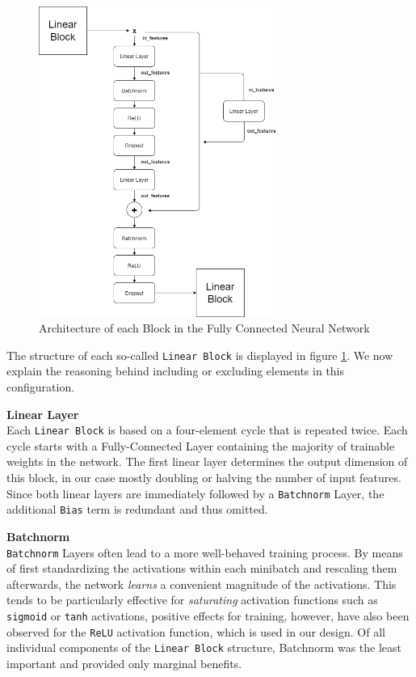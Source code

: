 \documentclass[12pt, letterpaper]{article}
\begin{document}
\begin{figure}[t]
    \centering
    \includegraphics[width=0.7\textwidth]{mlp_architecture.png}
    \caption{Architecture of each Block in the Fully Connected Neural Network}
    \label{fig:linear-block}
\end{figure}

The structure of each so-called \texttt{Linear Block} is displayed in figure \ref{fig:linear-block}.
We now explain the reasoning behind including or excluding elements in this configuration.

\textbf{Linear Layer} \\
Each \texttt{Linear Block} is based on a four-element cycle that is repeated twice.
Each cycle starts with a Fully-Connected Layer containing the majority of trainable weights in the network.
The first linear layer determines the output dimension of this block, in our case mostly doubling or halving the number of input features.
Since both linear layers are immediately followed by a \texttt{Batchnorm} Layer, the additional \texttt{Bias} term is redundant and thus omitted.

\textbf{Batchnorm} \\
\texttt{Batchnorm} Layers often lead to a more well-behaved training process.
By means of first standardizing the activations within each minibatch and rescaling them afterwards, the network \emph{learns} a convenient magnitude of the activations.
This tends to be particularly effective for \emph{saturating} activation functions such as \texttt{sigmoid} or \texttt{tanh} activations, positive effects for training, however, have also been observed for the \texttt{ReLU} activation function, which is used in our design.
Of all individual components of the \texttt{Linear Block} structure, Batchnorm was the least important and provided only marginal benefits.
\end{document}
